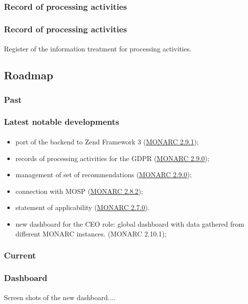 \subsubsection{Record of processing activities}
\begin{frame}
    \frametitle{Record of processing activities}
    \framesubtitle{}
    Register of the information treatment for processing activities.
\end{frame}



\subsection{Roadmap}
\subsubsection{Past}
\begin{frame}
    \frametitle{Latest notable developments}
    \framesubtitle{}
    \begin{itemize}
        \item port of the backend to Zend Framework 3 (\href{https://www.monarc.lu/news/2019/11/25/monarc-291-released/}{MONARC 2.9.1});
        \item records of processing activities for the GDPR (\href{https://www.monarc.lu/news/2019/08/23/monarc-290-released/}{MONARC 2.9.0});
        \item management of set of recommendations (\href{https://www.monarc.lu/news/2019/08/23/monarc-290-released/}{MONARC 2.9.0});
        \item connection with MOSP (\href{https://www.monarc.lu/news/2019/05/28/monarc-282-released/}{MONARC 2.8.2});
        \item statement of applicability (\href{https://www.monarc.lu/news/2018/08/22/monarc-270-released/}{MONARC 2.7.0}).
        \item new dashboard for the CEO role: global dashboard with data gathered from different MONARC instances. (MONARC 2.10.1);
    \end{itemize}
\end{frame}

\subsubsection{Current}
\begin{frame}
    \frametitle{Dashboard}
    \framesubtitle{}
    Screen shots of the new dashboard....
\end{frame}

